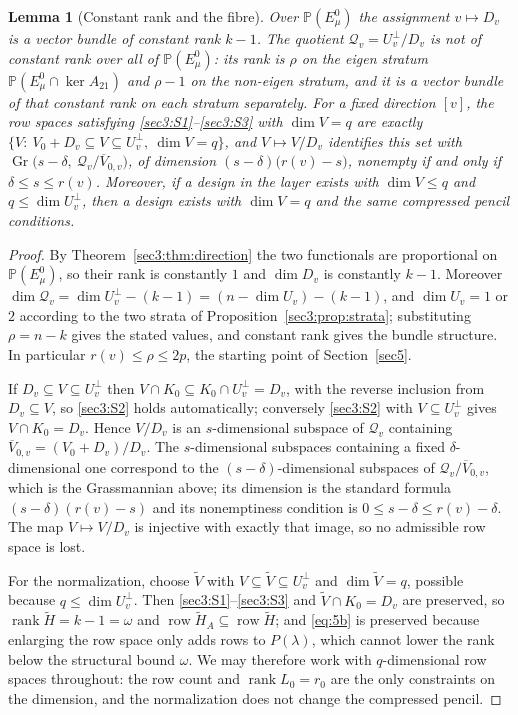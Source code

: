 \documentclass[journal]{IEEEtran}
\theoremstyle{plainn}
\newtheorem{lem}[thm]{Lemma}
\theoremstyle{remark}
\newcommand{\row}{\operatorname{row}}
\newcommand{\rank}{\operatorname{rank}}
\newcommand{\Gr}{\operatorname{Gr}}
\begin{document}
\begin{lem}[Constant rank and the fibre]
\label{sec3:lem:constantrank}
\label{sec3:lem:fibre}
\label{sec3:lem:fullrank}
Over $\mathbb{P}(E_\mu^0)$ the assignment $v\mapsto D_v$ is a vector bundle of constant rank $k-1$. The
quotient $\mathcal{Q}_v=U_v^\perp/D_v$ is \emph{not} of constant rank over all of $\mathbb{P}(E_\mu^0)$:
its rank is $\rho$ on the eigen stratum $\mathbb{P}(E_\mu^0\cap\ker A_{21})$ and $\rho-1$ on the
non-eigen stratum, and it is a vector bundle of that constant rank on each stratum separately. For a
fixed direction
$[v]$, the row spaces satisfying \ref{sec3:S1}--\ref{sec3:S3} with $\dim V=q$ are exactly
$\{V:\ V_0+D_v\subseteq V\subseteq U_v^\perp,\ \dim V=q\}$, and $V\mapsto V/D_v$ identifies this set
with $\Gr\bigl(s-\delta,\ \mathcal{Q}_v/\overline{V}_{0,v}\bigr)$, of dimension
$(s-\delta)\bigl(r(v)-s\bigr)$, nonempty if and only if $\delta\le s\le r(v)$. Moreover, if a design
in the layer exists with $\dim V\le q$ and $q\le\dim U_v^\perp$, then a design exists with $\dim V=q$
and the same compressed pencil conditions.
\end{lem}
\begin{proof}
By Theorem~\ref{sec3:thm:direction} the two functionals are proportional on $\mathbb{P}(E_\mu^0)$, so
their rank is constantly $1$ and $\dim D_v$ is constantly $k-1$. Moreover
$\dim\mathcal{Q}_v=\dim U_v^\perp-(k-1)=(n-\dim U_v)-(k-1)$, and $\dim U_v=1$ or $2$ according to the
two strata of Proposition~\ref{sec3:prop:strata}; substituting $\rho=n-k$ gives the stated values, and
constant rank gives the bundle structure. In particular $r(v)\le\rho\le2p$, the starting point of
Section~\ref{sec5}.

If $D_v\subseteq V\subseteq U_v^\perp$ then $V\cap K_0\subseteq K_0\cap U_v^\perp=D_v$, with the
reverse inclusion from $D_v\subseteq V$, so \ref{sec3:S2} holds automatically; conversely
\ref{sec3:S2} with $V\subseteq U_v^\perp$ gives $V\cap K_0=D_v$. Hence $V/D_v$ is an $s$-dimensional
subspace of $\mathcal{Q}_v$ containing $\overline{V}_{0,v}=(V_0+D_v)/D_v$. The $s$-dimensional
subspaces containing a fixed $\delta$-dimensional one correspond to the $(s-\delta)$-dimensional
subspaces of $\mathcal{Q}_v/\overline{V}_{0,v}$, which is the Grassmannian above; its dimension is the
standard formula $(s-\delta)(r(v)-s)$ and its nonemptiness condition is $0\le s-\delta\le r(v)-\delta$.
The map $V\mapsto V/D_v$ is injective with exactly that image, so no admissible row space is lost.

For the normalization, choose $\tilde V$ with $V\subseteq\tilde V\subseteq U_v^\perp$ and
$\dim\tilde V=q$, possible because $q\le\dim U_v^\perp$. Then \ref{sec3:S1}--\ref{sec3:S3} and
$\tilde V\cap K_0=D_v$ are preserved, so $\rank\tilde H=k-1=\omega$ and
$\row\tilde H_A\subseteq\row\tilde H$; and \eqref{eq:5b} is preserved because enlarging the row space
only adds rows to $P(\lambda)$, which cannot lower the rank below the structural bound $\omega$. We may
therefore work with $q$-dimensional row spaces throughout: the row count and $\rank L_0=r_0$ are the
only constraints on the dimension, and the normalization does not change the compressed pencil.
\end{proof}
\end{document}
